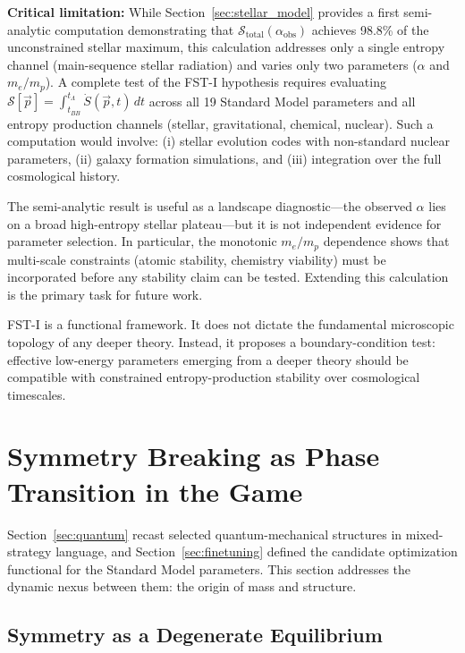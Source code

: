 \documentclass[12pt,a4paper]{article}
\theoremstyle{remark}
\begin{document}
\textbf{Critical limitation:} While Section~\ref{sec:stellar_model} provides a first semi-analytic computation demonstrating that $\mathcal{S}_{\text{total}}(\alpha_{\text{obs}})$ achieves 98.8\% of the unconstrained stellar maximum, this calculation addresses only a single entropy channel (main-sequence stellar radiation) and varies only two parameters ($\alpha$ and $m_e/m_p$). A complete test of the FST-I hypothesis requires evaluating $\mathcal{S}[\vec{p}] = \int_{t_{BB}}^{t_\Lambda} \dot{S}(\vec{p}, t)\,dt$ across all 19 Standard Model parameters and all entropy production channels (stellar, gravitational, chemical, nuclear). Such a computation would involve: (i) stellar evolution codes with non-standard nuclear parameters, (ii) galaxy formation simulations, and (iii) integration over the full cosmological history.

The semi-analytic result is useful as a landscape diagnostic---the observed $\alpha$ lies on a broad high-entropy stellar plateau---but it is not independent evidence for parameter selection. In particular, the monotonic $m_e/m_p$ dependence shows that multi-scale constraints (atomic stability, chemistry viability) must be incorporated before any stability claim can be tested. Extending this calculation is the primary task for future work.

FST-I is a functional framework. It does not dictate the fundamental microscopic topology of any deeper theory. Instead, it proposes a boundary-condition test: effective low-energy parameters emerging from a deeper theory should be compatible with constrained entropy-production stability over cosmological timescales.

\section{Symmetry Breaking as Phase Transition in the Game}
\label{sec:symmetry}

Section~\ref{sec:quantum} recast selected quantum-mechanical structures in mixed-strategy language, and Section~\ref{sec:finetuning} defined the candidate optimization functional for the Standard Model parameters. This section addresses the dynamic nexus between them: the origin of mass and structure.

\subsection{Symmetry as a Degenerate Equilibrium}
\end{document}
